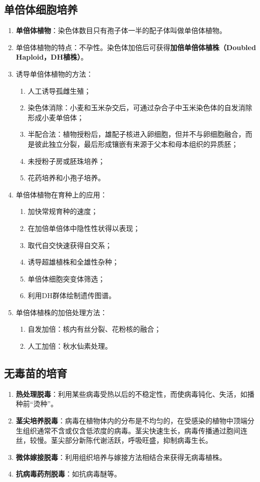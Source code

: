 \subsection{单倍体细胞培养}
\begin{enumerate}
    \item \textbf{单倍体植物}：染色体数目只有孢子体一半的配子体叫做单倍体植物。
    \item 单倍体植物的特点：不孕性。染色体加倍后可获得\textbf{加倍单倍体植株（Doubled Haploid，DH植株）}。
    \item 诱导单倍体植物的方法：
    \begin{enumerate}
        \item 人工诱导孤雌生殖；
        \item 染色体消除：小麦和玉米杂交后，可通过杂合子中玉米染色体的自发消除形成小麦单倍体；
        \item 半配合法：植物授粉后，雄配子核进入卵细胞，但并不与卵细胞融合，而是彼此独立分裂，最后形成镶嵌有来源于父本和母本组织的异质胚；
        \item 未授粉子房或胚珠培养；
        \item 花药培养和小孢子培养。
    \end{enumerate}
    \item 单倍体植物在育种上的应用：
    \begin{enumerate}
        \item 加快常规育种的速度；
        \item 在加倍单倍体中隐性性状得以表现；
        \item 取代自交快速获得自交系；
        \item 诱导超雄植株和全雄性杂种；
        \item 单倍体细胞突变体筛选；
        \item 利用DH群体绘制遗传图谱。
    \end{enumerate}
    \item 单倍体植株的加倍处理方法：
    \begin{enumerate}
        \item 自发加倍：核内有丝分裂、花粉核的融合；
        \item 人工加倍：秋水仙素处理。
    \end{enumerate}
\end{enumerate}
\subsection{无毒苗的培育}
\begin{enumerate}
    \item \textbf{热处理脱毒}：利用某些病毒受热以后的不稳定性，而使病毒钝化、失活，如播种前“烫种”。
    \item \textbf{茎尖培养脱毒}：病毒在植物体内的分布是不均匀的，在受感染的植物中顶端分生组织通常不含或仅含低浓度的病毒。茎尖快速生长，病毒传播通过胞间连丝，较慢。茎尖部分新陈代谢活跃，呼吸旺盛，抑制病毒生长。
    \item \textbf{微体嫁接脱毒}：利用组织培养与嫁接方法相结合来获得无病毒植株。
    \item \textbf{抗病毒药剂脱毒}：如抗病毒醚等。
\end{enumerate}
